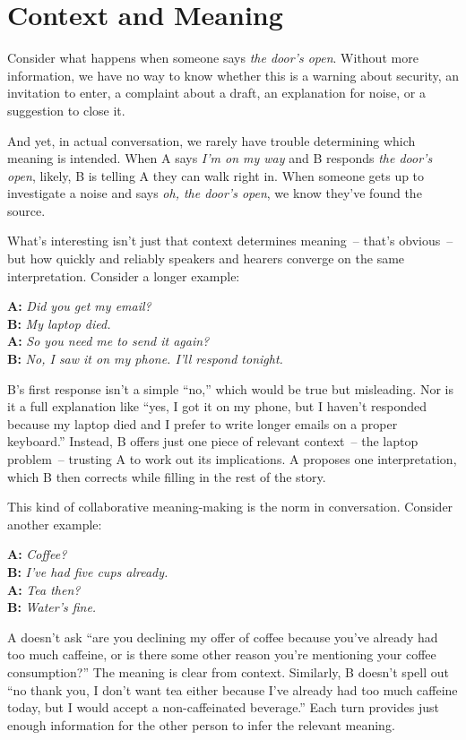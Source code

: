 \section{Context and Meaning}

Consider what happens when someone says \textit{the door's open}. Without more information, we have no way to know whether this is a warning about security, an invitation to enter, a complaint about a draft, an explanation for noise, or a suggestion to close it.

And yet, in actual conversation, we rarely have trouble determining which meaning is intended. When A says \textit{I'm on my way} and B responds \textit{the door's open}, likely, B is telling A they can walk right in. When someone gets up to investigate a noise and says \textit{oh, the door's open}, we know they've found the source. 

What's interesting isn't just that context determines meaning~-- that's obvious~-- but how quickly and reliably speakers and hearers converge on the same interpretation. Consider a longer example:

\ea
   \textbf{A:} \textit{Did you get my email?}\\
   \textbf{B:} \textit{My laptop died.}\\
   \textbf{A:} \textit{So you need me to send it again?}\\
   \textbf{B:} \textit{No, I saw it on my phone. I'll respond tonight.}
\z

B's first response isn't a simple ``no,'' which would be true but misleading. Nor is it a full explanation like ``yes, I got it on my phone, but I haven't responded because my laptop died and I prefer to write longer emails on a proper keyboard.'' Instead, B offers just one piece of relevant context~-- the laptop problem~-- trusting A to work out its implications. A proposes one interpretation, which B then corrects while filling in the rest of the story.

This kind of collaborative meaning-making is the norm in conversation. Consider another example:

\ea
   \textbf{A:} \textit{Coffee?}\\
   \textbf{B:} \textit{I've had five cups already.}\\
   \textbf{A:} \textit{Tea then?}\\
   \textbf{B:} \textit{Water's fine.}
\z

A doesn't ask ``are you declining my offer of coffee because you've already had too much caffeine, or is there some other reason you're mentioning your coffee consumption?'' The meaning is clear from context. Similarly, B doesn't spell out ``no thank you, I don't want tea either because I've already had too much caffeine today, but I would accept a non-caffeinated beverage.'' Each turn provides just enough information for the other person to infer the relevant meaning.

